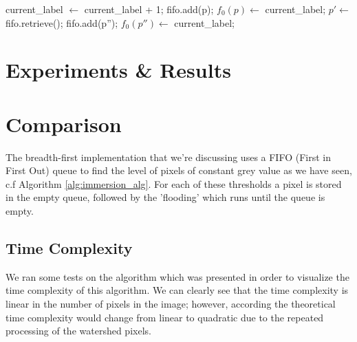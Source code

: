 \documentclass{article}
\begin{document}
\begin{algorithm}[H]
\begin{algorithmic}[1]
            \State current\_label $\gets$ current\_label + 1;
            \State fifo.add(p);
            \State $f_{0}(p) \gets $ current\_label;
                \State $p' \gets$ fifo.retrieve();
                        \State fifo.add(p'');
                        \State $f_{0}(p'') \gets$ current\_label;
                    \EndIf
                \EndFor
            \EndWhile
        \EndIf
    \EndFor    
\EndWhile
\EndProcedure
\end{algorithmic}
\end{algorithm}

\section{Experiments & Results}


\section{Comparison}
The breadth-first implementation that we're discussing uses a FIFO (First in First Out) queue to find the level of pixels of constant grey value as we have seen, c.f Algorithm \ref{alg:immersion_alg}. For each of these thresholds a pixel is stored in the empty queue, followed by the 'flooding' which runs until the queue is empty. 
\subsection{Time Complexity}

\begin{flushleft}
We ran some tests on the algorithm which was presented in order to visualize the time complexity of this algorithm. 
We can clearly see that the time complexity is linear in the number of pixels in the image; however, according \cite{timecomplexity} the theoretical time complexity would change from linear to quadratic due to the repeated processing of the watershed pixels.

\end{flushleft}
\end{document}

